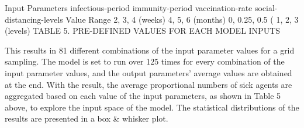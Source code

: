 \documentclass[smallextended]{svjour3}       %
\begin{document}
Input Parameters
infectious-period
immunity-period
vaccination-rate
social-distancing-levels
Value Range
2, 3, 4 (weeks)
4, 5, 6 (months)
0, 0.25, 0.5 (%
1, 2, 3 (levels)
        TABLE 5. PRE-DEFINED VALUES FOR EACH MODEL INPUTS
        
        
        This results in 81 different combinations of the input parameter values for a grid sampling. The model is set to run over 125 times for every combination of the input parameter values, and the output parameters’ average values are obtained at the end.
With the result, the average proportional numbers of sick agents are aggregated based on each value of the input parameters, as shown in Table 5 above, to explore the input space of the model. The statistical distributions of the results are presented in a box & whisker plot.
\end{document}
